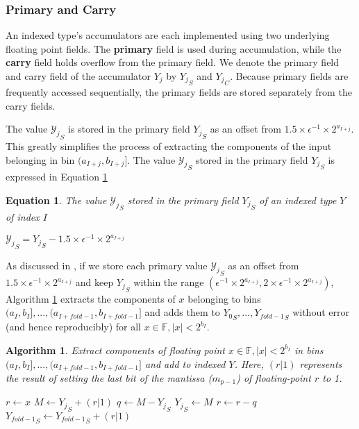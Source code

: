 \documentclass[12pt]{article}
\providecommand{\F}{\ensuremath{\mathbb{F}}}
\theoremstyle{plain}
\newtheorem{alg}{Algorithm}[section]
\newtheorem{eq}{Equation}[section]
\begin{document}
    \subsubsection{Primary and Carry}
      An indexed type's accumulators are each implemented using two underlying floating point fields. The \textbf{primary} field is used during accumulation, while the \textbf{carry} field holds overflow from the primary field. We denote the primary field and carry field of the accumulator $Y_j$ by ${Y_j}_S$ and ${Y_j}_C$. Because primary fields are frequently accessed sequentially, the primary fields are stored separately from the carry fields.

      The value ${\mathcal{Y}_j}_S$ is stored in the primary field ${Y_j}_S$ as an offset from $1.5\times \epsilon^{-1} \times 2^{a_{I + j}}$. This greatly simplifies the process of extracting the components of the input belonging in bin $(a_{I + j}, b_{I + j}]$.
      The value ${\mathcal{Y}_j}_S$ stored in the primary field ${Y_j}_S$ is expressed in Equation \ref{eq:pri}
      \begin{eq} The value ${\mathcal{Y}_j}_S$ stored in the primary field ${Y_j}_S$ of an indexed type $Y$ of index $I$

        ${\mathcal{Y}_j}_S = {Y_j}_S - 1.5\times\epsilon^{-1}\times2^{a_{I + j}}$
        \label{eq:pri}
      \end{eq}
      As discussed in \cite{repsum}, if we store each primary value ${\mathcal{Y}_j}_S$ as an offset from $1.5 \times \epsilon^{-1} \times 2^{a_{I + j}}$ and keep ${Y_j}_S$ within the range $(\epsilon^{-1} \times 2^{a_{I + j}}, 2 \times \epsilon^{-1} \times 2^{a_{I + j}})$, Algorithm \ref{alg:deposit} extracts the components of $x$ belonging to bins $(a_I, b_I], ..., (a_{I + fold - 1}, b_{I + fold - 1}]$ and adds them to ${Y_0}_S, ..., {Y_{fold - 1}}_S$ without error (and hence reproducibly) for all $x \in \F, |x| < 2^{b_I}$.
      \begin{alg}
        Extract components of floating point $x \in \F, |x| < 2^{b_I}$ in bins $(a_I, b_I], ..., (a_{I + fold - 1}, b_{I + fold - 1}]$ and add to indexed $Y$. Here, $(r | 1)$ represents the result of setting the last bit of the mantissa ($m_{p - 1}$) of floating-point $r$ to 1.
        \begin{algorithmic}
            \State $r \gets x$
              \State $M \gets {Y_j}_S + (r | 1)$
              \State $q \gets M - {Y_j}_S$
              \State ${Y_j}_S \gets M$
              \State $r \gets r - q$
            \EndFor
            \State ${Y_{fold - 1}}_S \gets {Y_{fold - 1}}_S + (r | 1)$
          \EndFunction
        \end{algorithmic}
        \label{alg:deposit}
      \end{alg}
\end{document}
